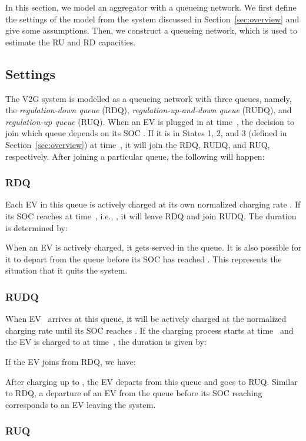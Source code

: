 \documentclass[journal]{IEEEtran}
\begin{document}
In this section, we model an aggregator with a queueing network.  We first
define the settings of the model from the system discussed in
Section~\ref{sec:overview} and give some assumptions.  Then, we construct a
queueing network, which is used to estimate the RU and RD capacities.

\subsection{Settings}

The V2G system is modelled as a queueing network with three queues, namely, the \textit{regulation-down queue} (RDQ), \textit{regulation-up-and-down queue}
(RUDQ), and \textit{regulation-up queue} (RUQ).  When an EV is plugged in at
time~, the decision to join which queue depends on its SOC .  If it
is in States 1, 2, and 3 (defined in Section~\ref{sec:overview}) at time~,
it will join the RDQ, RUDQ, and RUQ, respectively.  After joining a particular
queue, the following will happen:

\subsubsection{RDQ}

Each EV  in this queue is actively charged at its own normalized charging
rate .  If its SOC reaches  at time~, i.e.,
, it will leave RDQ and join RUDQ.  The duration is
determined by:

When an EV is actively charged, it gets served in the queue.  It is also
possible for it to depart from the queue before its SOC has reached
.  This represents the situation that it quits the system. 

\subsubsection{RUDQ}

When EV~ arrives at this queue, it will be actively charged at the
normalized charging rate  until its SOC reaches .  If the
charging process starts at time~ and the EV is charged to 
at time~, the duration is given by:

If the EV joins from RDQ, we have:

After charging up to , the EV departs from this queue and goes
to RUQ.  Similar to RDQ, a departure of an EV from the queue before its SOC
reaching  corresponds to an EV leaving the system.

\subsubsection{RUQ}
\end{document}
